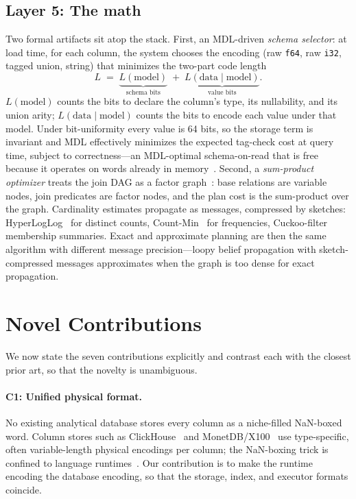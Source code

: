 \documentclass[10pt]{article}
\begin{document}
\subsection{Layer 5: The math}
Two formal artifacts sit atop the stack. First, an MDL-driven
\emph{schema selector}: at load time, for each column, the system
chooses the encoding (raw \texttt{f64}, raw \texttt{i32}, tagged union,
string) that minimizes the two-part code length
\begin{equation}
\label{eq:mdl}
L \;=\; \underbrace{L(\text{model})}_{\text{schema bits}}
\;+\; \underbrace{L(\text{data}\mid\text{model})}_{\text{value bits}}.
\end{equation}
$L(\text{model})$ counts the bits to declare the column's type, its
nullability, and its union arity; $L(\text{data}\mid\text{model})$
counts the bits to encode each value under that model. Under
bit-uniformity every value is 64 bits, so the storage term is
invariant and MDL effectively minimizes the expected tag-check cost at
query time, subject to correctness---an MDL-optimal schema-on-read that
is free because it operates on words already in
memory~\citep{grunwald2004mdl}. Second, a \emph{sum-product optimizer}
treats the join DAG as a factor graph~\citep{kschischang2001factor}:
base relations are variable nodes, join predicates are factor nodes,
and the plan cost is the sum-product over the graph. Cardinality
estimates propagate as messages, compressed by sketches:
HyperLogLog~\citep{flajolet2007hyperloglog} for distinct counts,
Count-Min~\citep{cormode2005countmin} for frequencies,
Cuckoo-filter~\citep{fan2014cuckoo} membership summaries. Exact and
approximate planning are then the same algorithm with different
message precision---loopy belief propagation with sketch-compressed
messages approximates when the graph is too dense for exact
propagation.

\section{Novel Contributions}
\label{sec:contrib}

We now state the seven contributions explicitly and contrast each with
the closest prior art, so that the novelty is unambiguous.

\paragraph{C1: Unified physical format.}
No existing analytical database stores every column as a niche-filled
NaN-boxed word. Column stores such as
ClickHouse~\citep{schulze2024clickhouse} and
MonetDB/X100~\citep{boncz2005monetdb} use type-specific, often
variable-length physical encodings per column; the NaN-boxing trick is
confined to language runtimes~\citep{wingo2011value,gal2009trace}. Our
contribution is to make the runtime encoding the database encoding, so
that the storage, index, and executor formats coincide.
\end{document}
